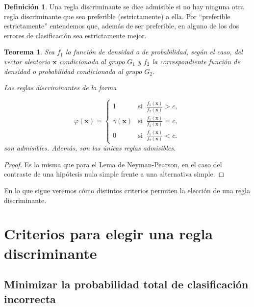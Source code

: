 \documentclass[
  a4paper,
  oneside]{scrbook}
\newtheorem{theorem}{Teorema}[chapter]
\theoremstyle{definition}
\newtheorem{definition}{Definición}[chapter]
\theoremstyle{definition}
\theoremstyle{definition}
\theoremstyle{definition}
\theoremstyle{remark}
\begin{document}
\begin{definition}
\protect\hypertarget{def:unnamed-chunk-92}{}\label{def:unnamed-chunk-92}Una regla discriminante se dice admisible si no hay ninguna otra regla
discriminante que sea preferible (estrictamente) a ella. Por ``preferible
estrictamente'' entendemos que, además de ser preferible, en alguno de
los dos errores de clasificación sea estrictamente mejor.
\end{definition}

\begin{theorem}
\protect\hypertarget{thm:unnamed-chunk-93}{}\label{thm:unnamed-chunk-93}Sea \(f_1\) la función de densidad o de probabilidad, según el caso, del
vector aleatorio \(\bm{x}\) condicionada al grupo \(G_1\) y \(f_2\) la
correspondiente función de densidad o probabilidad condicionada al grupo
\(G_2\).

Las reglas discriminantes de la forma

\[\varphi(\bm{x})=\left\{
{\displaystyle \begin{array}{ll}
1 & \mbox{si }\ {\displaystyle \frac{f_1(\bm{x})}{f_2(\bm{x})} > c, } \\
\gamma(\bm{x}) & \mbox{si }\ {\displaystyle \frac{f_1(\bm{x})}{f_2(\bm{x})} = c,} \\
0 & \mbox{si }\ {\displaystyle \frac{f_1(\bm{x})}{f_2(\bm{x})} < c.}
\end{array}}\right.\] son admisibles. Además, son las únicas reglas admisibles.
\end{theorem}

\begin{proof}
Es la misma que para el Lema de Neyman-Pearson, en el caso del
contraste de una hipótesis nula simple frente a una alternativa
simple.
\end{proof}

En lo que sigue veremos cómo distintos criterios permiten la elección de
una regla discriminante.

\section{Criterios para elegir una regla discriminante}\label{criterios-para-elegir-una-regla-discriminante}

\subsection{Minimizar la probabilidad total de clasificación incorrecta}\label{minimizar-la-probabilidad-total-de-clasificacion-incorrecta}
\end{document}
